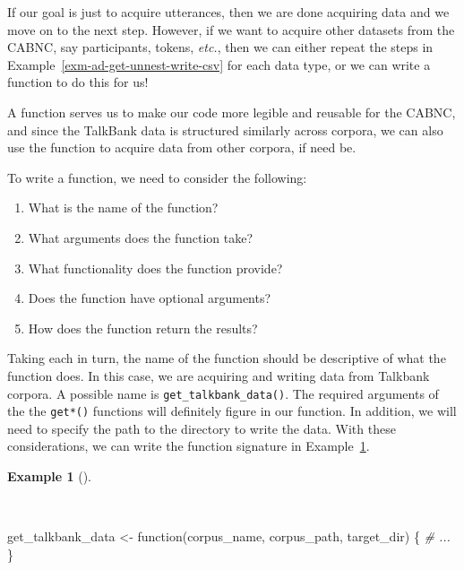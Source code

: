 \documentclass[
  letterpaper,
]{latex/krantz}
\newenvironment{Shaded}{\begin{snugshade}}{\end{snugshade}}
\newcommand{\CommentTok}[1]{\textcolor[rgb]{0.00,0.00,0.00}{\textit{#1}}}
\newcommand{\ControlFlowTok}[1]{\textcolor[rgb]{0.00,0.00,0.00}{#1}}
\newcommand{\NormalTok}[1]{\textcolor[rgb]{0.00,0.00,0.00}{#1}}
\newcommand{\OtherTok}[1]{\textcolor[rgb]{0.00,0.00,0.00}{#1}}
\providecommand{\tightlist}{%
  \setlength{\itemsep}{0pt}\setlength{\parskip}{0pt}}\usepackage{longtable,booktabs,array}
\theoremstyle{definition}
\newtheorem{example}{Example}[chapter]
\theoremstyle{remark}
\begin{document}
If our goal is just to acquire utterances, then we are done acquiring
data and we move on to the next step. However, if we want to acquire
other datasets from the CABNC, say participants, tokens, \emph{etc.},
then we can either repeat the steps in
Example~\ref{exm-ad-get-unnest-write-csv} for each data type, or we can
write a function to do this for us!

A function serves us to make our code more legible and reusable for the
CABNC, and since the TalkBank data is structured similarly across
corpora, we can also use the function to acquire data from other
corpora, if need be.

To write a function, we need to consider the following:

\begin{enumerate}
\def\labelenumi{\arabic{enumi}.}
\tightlist
\item
  What is the name of the function?
\item
  What arguments does the function take?
\item
  What functionality does the function provide?
\item
  Does the function have optional arguments?
\item
  How does the function return the results?
\end{enumerate}

Taking each in turn, the name of the function should be descriptive of
what the function does. In this case, we are acquiring and writing data
from Talkbank corpora. A possible name is
\texttt{get\_talkbank\_data()}. The required arguments of the the
\texttt{get*()} functions will definitely figure in our function. In
addition, we will need to specify the path to the directory to write the
data. With these considerations, we can write the function signature in
Example~\ref{exm-ad-get-talkbank-data-1}.

\begin{example}[]\protect\hypertarget{exm-ad-get-talkbank-data-1}{}\label{exm-ad-get-talkbank-data-1}

~

\begin{Shaded}
\begin{Highlighting}[]
\NormalTok{get\_talkbank\_data }\OtherTok{\textless{}{-}} \ControlFlowTok{function}\NormalTok{(corpus\_name, corpus\_path, target\_dir) \{}
  \CommentTok{\# ...}
\NormalTok{\}}
\end{Highlighting}
\end{Shaded}

\end{example}
\end{document}
